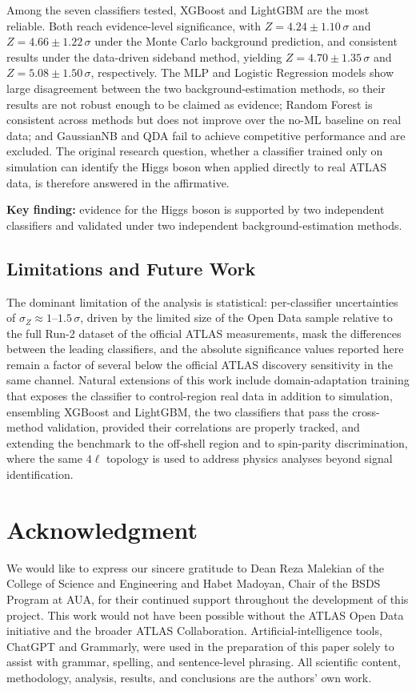 \documentclass[conference]{IEEEtran}
\begin{document}
{Among the seven classifiers tested, XGBoost and LightGBM are the most reliable. Both reach evidence-level significance, with $Z = 4.24 \pm 1.10\,\sigma$ and $Z = 4.66 \pm 1.22\,\sigma$ under the Monte Carlo background prediction, and consistent results under the data-driven sideband method, yielding $Z = 4.70 \pm 1.35\,\sigma$ and $Z = 5.08 \pm 1.50\,\sigma$, respectively. The MLP and Logistic Regression models show large disagreement between the two background-estimation methods, so their results are not robust enough to be claimed as evidence; Random Forest is consistent across methods but does not improve over the no-ML baseline on real data; and GaussianNB and QDA fail to achieve competitive performance and are excluded. The original research question, whether a classifier trained only on simulation can identify the Higgs boson when applied directly to real ATLAS data, is therefore answered in the affirmative.

\textbf{Key finding:} evidence for the Higgs boson is supported by two independent classifiers and validated under two independent background-estimation methods.

\subsection{Limitations and Future Work}
The dominant limitation of the analysis is statistical: per-classifier uncertainties of $\sigma_Z \approx 1$--$1.5\,\sigma$, driven by the limited size of the Open Data sample relative to the full Run-2 dataset of the official ATLAS measurements, mask the differences between the leading classifiers, and the absolute significance values reported here remain a factor of several below the official ATLAS discovery sensitivity in the same channel. Natural extensions of this work include domain-adaptation training that exposes the classifier to control-region real data in addition to simulation, ensembling XGBoost and LightGBM, the two classifiers that pass the cross-method validation, provided their correlations are properly tracked, and extending the benchmark to the off-shell region and to spin-parity discrimination, where the same $4\ell$ topology is used to address physics analyses beyond signal identification.

\section*{Acknowledgment}
We would like to express our sincere gratitude to Dean Reza Malekian of the College of Science and Engineering and Habet Madoyan, Chair of the BSDS Program at AUA, for their continued support throughout the development of this project. This work would not have been possible without the ATLAS Open Data initiative and the broader ATLAS Collaboration.
Artificial-intelligence tools, ChatGPT and Grammarly, were used in the preparation of this paper solely to assist with grammar, spelling, and sentence-level phrasing. All scientific content, methodology, analysis, results, and conclusions are the authors' own work.



}
\end{document}

